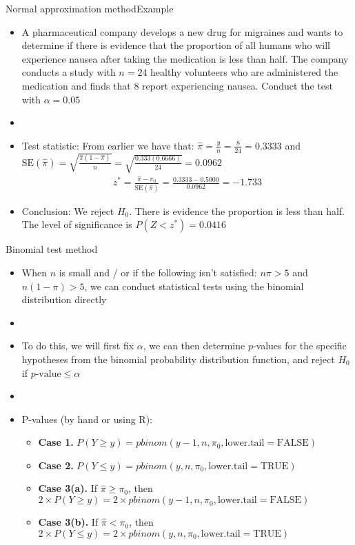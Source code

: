 \documentclass[xcolor=dvipsnames]{beamer}
\begin{document}
\begin{frame}{Normal approximation method}{Example}
	\begin{itemize}
		\item A pharmaceutical company develops a new drug for migraines and wants to determine if there is evidence that the proportion of all humans who will experience nausea after taking the medication is less than half. The company conducts a study with $n = 24$ healthy volunteers who are administered the medication and finds that 8 report experiencing nausea. Conduct the test with $\alpha = 0.05$
		\item[]
		\item Test statistic: From earlier we have that: $\hat{\pi} = \frac{y}{n} = \frac{8}{24} = 0.3333$ and $		\text{SE}(\hat{\pi})=\sqrt{\frac{\hat{\pi}(1-\hat{\pi})}{n}} = \sqrt{\frac{0.333(0.6666)}{24}} = 0.0962$  \pause
			\begin{gather*}
				z^* = \frac{\hat{\pi}-\pi_0}{\text{SE}(\hat{\pi})} = \frac{0.3333-0.5000}{0.0962} =-1.733
			\end{gather*} \pause
		\item Conclusion: We reject $H_0$. There is evidence the proportion is less than half. The level of significance is $P(Z < z^*) = 0.0416$
	\end{itemize}
\end{frame}

\begin{frame}{Binomial test method}
	\begin{itemize}
		\item When $n$ is small and / or if the following isn't satisfied: $n \pi > 5$ and $n(1-\pi) > 5$, we can conduct statistical tests using the binomial distribution directly  \pause
		\item[]
		\item To do this, we will first fix $\alpha$, we can then determine $p$-values for the specific hypotheses from the binomial probability distribution function, and reject $H_0$ if $p\text{-value} \leq \alpha$  \pause
		\item[]
		\item P-values (by hand or using R):
		\begin{itemize}
			\item \textbf{Case 1.} $P(Y \geq y) = pbinom(y - 1, n, \pi_0, \text{lower.tail} = \text{FALSE})$  \pause
			\item \textbf{Case 2.} $P(Y \leq y) = pbinom(y, n, \pi_0, \text{lower.tail} = \text{TRUE})$  \pause
			\item \textbf{Case 3(a).} If $\hat{\pi}\geq \pi_0$, then $2\times P(Y \geq y) = 2 \times pbinom(y - 1, n, \pi_0, \text{lower.tail} = \text{FALSE})$  \pause
			\item \textbf{Case 3(b).} If $\hat{\pi}< \pi_0$, then $2 \times P(Y \leq y) = 2 \times pbinom(y, n, \pi_0, \text{lower.tail} = \text{TRUE})$
		\end{itemize}
	\end{itemize}
\end{frame}
\end{document}
